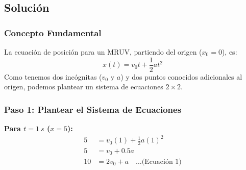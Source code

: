 \documentclass[12pt, a4paper]{article}
\begin{document}
\begin{center}
\end{center}

\subsection*{Solución}

\subsubsection*{Concepto Fundamental}
La ecuación de posición para un MRUV, partiendo del origen ($x_0 = 0$), es:
\begin{equation}
    x(t) = v_0 t + \frac{1}{2} a t^2
\end{equation}
Como tenemos dos incógnitas ($v_0$ y $a$) y dos puntos conocidos adicionales al origen, podemos plantear un sistema de ecuaciones $2 \times 2$.

\subsubsection*{Paso 1: Plantear el Sistema de Ecuaciones}

\textbf{Para $t = \SI{1}{s}$ ($x = 5$):}
\begin{align*}
    5 &= v_0(1) + \frac{1}{2}a(1)^2 \\
    5 &= v_0 + 0.5a \\
    10 &= 2v_0 + a \quad \dots \text{(Ecuación 1)}
\end{align*}
\end{document}
